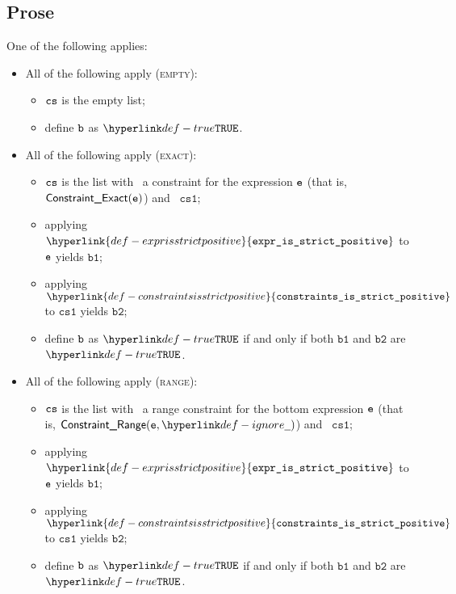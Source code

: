 \documentclass{book}
\newcommand\constraintsisstrictpositive[0]{\hyperlink{def-constraintsisstrictpositive}{\texttt{constraints\_is\_strict\_positive}}}
\newcommand\exprisstrictpositive[0]{\hyperlink{def-exprisstrictpositive}{\texttt{expr\_is\_strict\_positive}}}
\newcommand\csone[0]{\texttt{cs1}}
\newcommand\vbone[0]{\texttt{b1}}
\newcommand\vbtwo[0]{\texttt{b2}}
\begin{document}
\subsection{Prose}
One of the following applies:
\begin{itemize}
  \item All of the following apply (\textsc{empty}):
  \begin{itemize}
    \item $\texttt{cs}$ is the empty list;
    \item define $\texttt{b}$ as $\True$.
  \end{itemize}

  \item All of the following apply (\textsc{exact}):
  \begin{itemize}
    \item $\texttt{cs}$ is the list with \head\ a constraint for the expression $\texttt{e}$ (that is, \\
          $\textsf{Constraint\_Exact}(\texttt{e})$) and \tail\ $\csone$;
    \item applying $\exprisstrictpositive$ to $\texttt{e}$ yields $\vbone$;
    \item applying $\constraintsisstrictpositive$ to $\csone$ yields $\vbtwo$;
    \item define $\texttt{b}$ as $\True$ if and only if both $\vbone$ and $\vbtwo$ are $\True$.
  \end{itemize}

  \item All of the following apply (\textsc{range}):
  \begin{itemize}
    \item $\texttt{cs}$ is the list with \head\ a range constraint for the bottom expression $\texttt{e}$ (that is, $\ConstraintRange(\ve, \Ignore)$)
          and \tail\ $\csone$;
    \item applying $\exprisstrictpositive$ to $\texttt{e}$ yields $\vbone$;
    \item applying $\constraintsisstrictpositive$ to $\csone$ yields $\vbtwo$;
    \item define $\texttt{b}$ as $\True$ if and only if both $\vbone$ and $\vbtwo$ are $\True$.
  \end{itemize}
\end{itemize}
\end{document}
